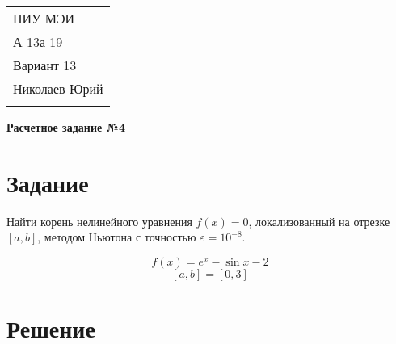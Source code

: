 \documentclass[a4paper,12pt]{article} %
\begin{document}
\thispagestyle{empty} 

\begin{tabular}{p{15.5cm}} 
НИУ МЭИ \\ А-13а-19  \\ Вариант 13 \\ Николаев Юрий\\
\hline 
\\
\end{tabular} 

\vspace*{0.3cm}

\begin{center} 
	{\Large \bf Расчетное задание №4} 
	\vspace{2mm}
\end{center}  

\vspace{0.4cm}


\section{Задание}
Найти корень нелинейного уравнения $f(x) = 0$, локализованный на отрезке $[a, b]$, методом Ньютона с точностью $\varepsilon = 10^{-8}$.

$$f(x) = e^x - \sin x - 2$$
$$[a, b] = [0, 3]$$

\section{Решение}
\end{document}
